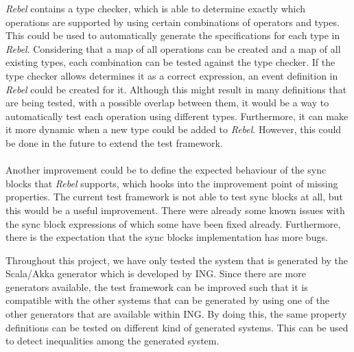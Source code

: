 \textit{Rebel} contains a type checker, which is able to determine exactly which operations are supported by using certain combinations of operators and types. This could be used to automatically generate the specifications for each type in \textit{Rebel}. Considering that a map of all operations can be created and a map of all existing types, each combination can be tested against the type checker. If the type checker allows determines it as a correct expression, an event definition in \textit{Rebel} could be created for it. Although this might result in many definitions that are being tested, with a possible overlap between them, it would be a way to automatically test each operation using different types. Furthermore, it can make it more dynamic when a new type could be added to \textit{Rebel}. However, this could be done in the future to extend the test framework.\\
\\
Another improvement could be to define the expected behaviour of the sync blocks that \textit{Rebel} supports, which hooks into the improvement point of missing properties. The current test framework is not able to test sync blocks at all, but this would be a useful improvement. There were already some known issues with the sync block expressions of which some have been fixed already. Furthermore, there is the expectation that the sync blocks implementation has more bugs.


Throughout this project, we have only tested the system that is generated by the Scala/Akka generator which is developed by ING. Since there are more generators available, the test framework can be improved such that it is compatible with the other systems that can be generated by using one of the other generators that are available within ING. By doing this, the same property definitions can be tested on different kind of generated systems. This can be used to detect inequalities among the generated system.

